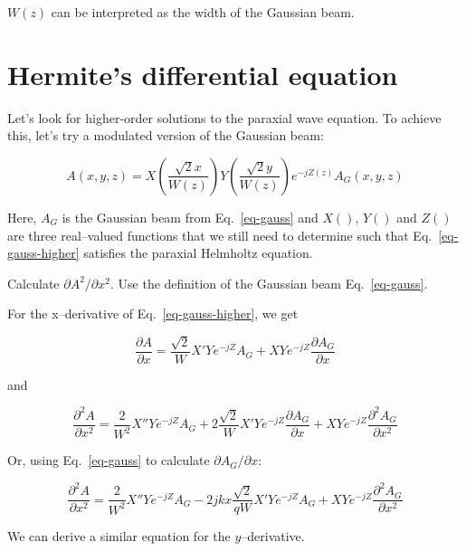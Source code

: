 $W(z)$ can be interpreted as the width of the Gaussian beam.


\pagebreak


\section{Hermite's differential equation}

Let's look for higher-order solutions to the paraxial wave equation. To achieve this, let's try a modulated version of the Gaussian beam:

\begin{equation}
A(x,y,z) = X\left({\frac{\sqrt{2}x}{W(z)}}\right) Y\left({\frac{\sqrt{2}y}{W(z)}}\right) e^{-jZ(z)} A_G(x,y,z) \label{eq-gauss-higher}
\end{equation} 

Here, $A_G$ is the Gaussian beam from Eq.~\ref{eq-gauss} and $X()$, $Y()$ and $Z()$ are three real--valued functions that we still need to determine such that Eq.~\ref{eq-gauss-higher} satisfies the paraxial Helmholtz equation.

\begin{cue}
Calculate $\partial A^2 / \partial x^2$. Use the definition of the Gaussian beam Eq.~\ref{eq-gauss}. 
\end{cue}
  
For the x--derivative of Eq.~\ref{eq-gauss-higher}, we get

\begin{equation}
\frac{\partial A}{\partial x} = \frac{\sqrt{2}}{W}X'Ye^{-jZ} A_G + XYe^{-jZ} \frac{\partial A_G}{\partial x} 
\end{equation} 

and

\begin{equation}
\frac{\partial^2 A}{\partial x^2} = \frac{2}{W^2}X''Ye^{-jZ} A_G  + 2\frac{\sqrt{2}}{W}X'Ye^{-jZ} \frac{\partial A_G}{\partial x}  + XYe^{-jZ} \frac{\partial^2 A_G}{\partial x^2}
\end{equation} 

Or, using Eq.~\ref{eq-gauss} to calculate $\partial A_G / \partial x$:

\begin{equation}
\frac{\partial^2 A}{\partial x^2} = \frac{2}{W^2}X''Ye^{-jZ} A_G  - 2j k x \frac{\sqrt{2}}{qW}X'Ye^{-jZ}A_G  + XYe^{-jZ} \frac{\partial^2 A_G}{\partial x^2} \label{eq-hermite-gauss-1}
\end{equation} 

We can derive a similar equation for the $y$--derivative.

